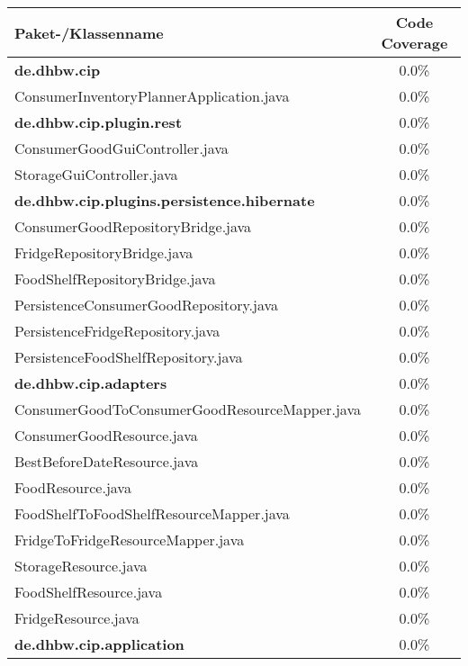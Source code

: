 \begin{table}[ht]
    \begin{tabular}{|l|c|}
        \hline
        \textbf{Paket-/Klassenname} & \textbf{Code Coverage} \\
        \hline
        \textbf{de.dhbw.cip} & 0.0\% \\
        \hline
        ConsumerInventoryPlannerApplication.java & 0.0\% \\
        \hline
        \textbf{de.dhbw.cip.plugin.rest} & 0.0\% \\
        \hline
        ConsumerGoodGuiController.java & 0.0\% \\
        \hline
        StorageGuiController.java & 0.0\% \\
        \hline
        \textbf{de.dhbw.cip.plugins.persistence.hibernate} & 0.0\% \\
        \hline
        ConsumerGoodRepositoryBridge.java & 0.0\% \\
        \hline
        FridgeRepositoryBridge.java & 0.0\% \\
        \hline
        FoodShelfRepositoryBridge.java & 0.0\% \\
        \hline
        PersistenceConsumerGoodRepository.java & 0.0\% \\
        \hline
        PersistenceFridgeRepository.java & 0.0\% \\
        \hline
        PersistenceFoodShelfRepository.java & 0.0\% \\
        \hline
        \textbf{de.dhbw.cip.adapters} & 0.0\% \\
        \hline
        ConsumerGoodToConsumerGoodResourceMapper.java & 0.0\% \\
        \hline
        ConsumerGoodResource.java & 0.0\% \\
        \hline
        BestBeforeDateResource.java & 0.0\% \\
        \hline
        FoodResource.java & 0.0\% \\
        \hline
        FoodShelfToFoodShelfResourceMapper.java & 0.0\% \\
        \hline
        FridgeToFridgeResourceMapper.java & 0.0\% \\
        \hline
        StorageResource.java & 0.0\% \\
        \hline
        FoodShelfResource.java & 0.0\% \\
        \hline
        FridgeResource.java & 0.0\% \\
        \hline
        \textbf{de.dhbw.cip.application} & 0.0\% \\

\end{tabular}
\end{table}
